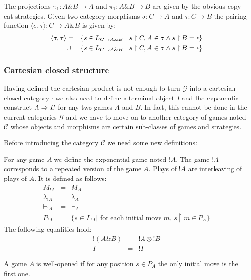 The projections $\pi_1:A \& B \rightarrow A$ and $\pi_1:A \& B \rightarrow B$ are given by the obvious copy-cat strategies.
Given two category morphisms $\sigma :C \rightarrow A$ and $\tau : C \rightarrow B$ the pairing function
$\langle \sigma, \tau \rangle : C \rightarrow A \& B$ is given by:
\begin{eqnarray*}
\langle \sigma, \tau \rangle &=& \{ s \in L_{C\multimap A\&B} \ | \ s \upharpoonright C,A \in \sigma \wedge s \upharpoonright B = \epsilon  \} \\
&\cup& \{ s \in L_{C\multimap A\&B} \ | \ s \upharpoonright C,A \in \sigma \wedge s \upharpoonright B = \epsilon  \}
\end{eqnarray*}

\subsubsection{Cartesian closed structure}
Having defined the cartesian product is not enough to turn $\mathcal{G}$ into a cartesian closed category :
we also need to define a terminal object $I$ and the exponential construct $A \Rightarrow B$ for any two games $A$ and $B$.
In fact, this cannot be done in the current categories $\mathcal{G}$ and we have to move on to another category
of games noted $\mathcal{C}$ whose objects and morphisms are certain sub-classes of games and strategies.

Before introducing the category $\mathcal{C}$ we need some new definitions:


For any game $A$ we define the exponential game noted $!A$.
The game $!A$ corresponds to a repeated version of the game $A$. Plays of $!A$ are interleaving of plays of
$A$. It is defined as follows:
\begin{eqnarray*}
  M_{!A} &=& M_A \\
  \lambda_{!A} &=& \lambda_A \\
  \vdash_{!A} & = & \vdash_{A} \\
  P_{!A} & = & \{ s \in L_{!A} | \mbox{ for each initial move $m$, } s \upharpoonright m \in P_A \}
\end{eqnarray*}
The following equalities hold:
\begin{eqnarray*}
  !(A \& B) &=& !A \otimes !B\\
  I &=& !I
\end{eqnarray*}

\begin{dfn}
A game $A$ is well-opened if for any position $s \in P_A$ the only initial move is the first
one.
\end{dfn}

